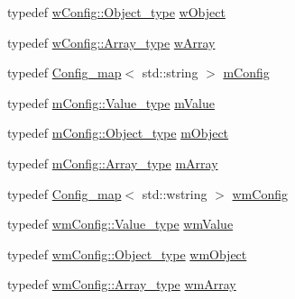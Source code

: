 \begin{DoxyCompactItemize}
\item 
typedef \hyperlink{structjson__spirit_1_1_config__vector_a070c3d1a0aea6da7c24a60400d52f15d}{w\+Config\+::\+Object\+\_\+type} \hyperlink{namespacejson__spirit_a0f2593cf7c48c581b018a80cd2400c22}{w\+Object}
\item 
typedef \hyperlink{structjson__spirit_1_1_config__vector_af33059c26ec27a5153b53dd4bd312815}{w\+Config\+::\+Array\+\_\+type} \hyperlink{namespacejson__spirit_ae12b0f52e988920d99e90df589d1a551}{w\+Array}
\item 
typedef \hyperlink{structjson__spirit_1_1_config__map}{Config\+\_\+map}$<$ std\+::string $>$ \hyperlink{namespacejson__spirit_a289a50461fb90a7771e9956489ab53d0}{m\+Config}
\item 
typedef \hyperlink{structjson__spirit_1_1_config__map_a1beec86663fb1ca76e98852b93a90c5c}{m\+Config\+::\+Value\+\_\+type} \hyperlink{namespacejson__spirit_a4dfd55710919c7c5e20fcbe4e4fe7b46}{m\+Value}
\item 
typedef \hyperlink{structjson__spirit_1_1_config__map_a64fd50a8a903e22e3909e83244a0c92f}{m\+Config\+::\+Object\+\_\+type} \hyperlink{namespacejson__spirit_a235e5d2ccd2bbf3b05ca082988cd6d33}{m\+Object}
\item 
typedef \hyperlink{structjson__spirit_1_1_config__map_a2efd6f753201c1c08c30d96e27c192d7}{m\+Config\+::\+Array\+\_\+type} \hyperlink{namespacejson__spirit_ad8188045899c36f157d67e13b277fa36}{m\+Array}
\item 
typedef \hyperlink{structjson__spirit_1_1_config__map}{Config\+\_\+map}$<$ std\+::wstring $>$ \hyperlink{namespacejson__spirit_a7a9abcf0ae8c9bc1d946c10e935c28c6}{wm\+Config}
\item 
typedef \hyperlink{structjson__spirit_1_1_config__map_a1beec86663fb1ca76e98852b93a90c5c}{wm\+Config\+::\+Value\+\_\+type} \hyperlink{namespacejson__spirit_a2b6befe411be23e2a1a9ca590ef212b5}{wm\+Value}
\item 
typedef \hyperlink{structjson__spirit_1_1_config__map_a64fd50a8a903e22e3909e83244a0c92f}{wm\+Config\+::\+Object\+\_\+type} \hyperlink{namespacejson__spirit_a485c7d9bf9e138b0b89ec61a03dc6c2a}{wm\+Object}
\item 
typedef \hyperlink{structjson__spirit_1_1_config__map_a2efd6f753201c1c08c30d96e27c192d7}{wm\+Config\+::\+Array\+\_\+type} \hyperlink{namespacejson__spirit_a189949a59336840dc8c8d844453a3cd5}{wm\+Array}
\end{DoxyCompactItemize}
